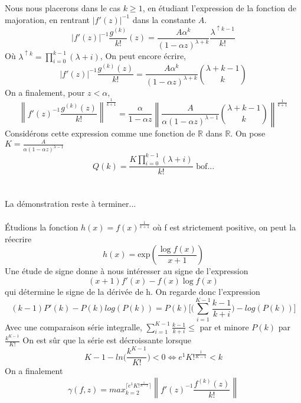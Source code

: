 \documentclass[a4paper,10.5pt]{article}
\begin{document}
	\begin{demonstration}
		\noindent Nous nous placerons dans le cas $k\geq 1$, en étudiant l'expression de la fonction de majoration, en rentrant $|f'(z)|^{-1}$ dans la constante $A$. 
		\[|f'(z)|^{-1}\frac{g^{(k)}}{k!}(z)=\frac{A\alpha^{k}}{(1-\alpha z)^{\lambda+k}}\frac{\lambda^{\uparrow k-1}}{k!}\]
		Où $\lambda^{\uparrow k}=\prod_{i=0}^{k-1}(\lambda+i)$, On peut encore écrire,
		\[|f'(z)|^{-1}\frac{g^{(k)}(z)}{k!}=\frac{A\alpha^{k}}{(1-\alpha z)^{\lambda+k}} \binom{\lambda+k-1}{k}\]
		On a finalement, pour $z < \alpha$,
		\[\left\|f'(z)^{-1}\frac{g^{(k)}(z)}{k!}\right\|^{\frac{1}{k+1}}= \frac{\alpha}{1-\alpha z} \left\|\frac{A}{\alpha(1-\alpha z)^{\lambda-1}}\binom{\lambda+k-1}{k}\right\|^{\frac{1}{k+1}} \tag{*}\]
		Considérons cette expression comme une fonction de $\mathbb{R}$ dans $\mathbb{R}$. On pose $K=\frac{A}{\alpha(1-\alpha z)^{\lambda-1}}$
		\[Q(k)=\frac{K\prod_{i=0}^{k-1}(\lambda+i)}{k!} \text{   bof...}\]
		\\
		\\
		La démonstration reste à terminer...
		\\
		\\
		\noindent Étudions la fonction $h(x)=f(x)^{\frac{1}{x+1}}$ où f est strictement positive, on peut la réecrire
		\[h(x)=\text{exp}(\frac{\log f(x)}{x+1}) \]
		Une étude de signe donne à nous intéresser au signe de l'expression
		\[(x+1)f'(x)-f(x)\log f(x) \tag{1}\] 
		qui détermine le signe de la dérivée de h. On regarde donc l'expression 
		\[(k-1)P'(k)-P(k)log(P(k))=P(k)\Big[\big(\sum_{i=1}^{K-1}\frac{k-1}{k+i}\big)-log(P(k))\Big]\]
		Avec une comparaison série integralle, $\sum_{i=1}^{K-1}\frac{k-1}{k+i} \leq $ par et minore $P(k)$ par $\frac{k^{K-1}}{K!}$ On est sûr que la série est décroissante lorsque 
		\[K-1-ln\big(\frac{k^{K-1}}{K!}\big)<0 \Longleftrightarrow e^{1}K!^{\frac{1}{K-1}}< k\]
		On a finalement 
		\[\gamma(f,z)=max_{k=2}^{\lceil e^{1}K!^{\frac{1}{K-1}} \rceil}\left\|f'(z)^{-1}\frac{f^{(k)}(z)}{k!}\right\| \]
	\end{demonstration}

	
	
	
	
\end{document}
